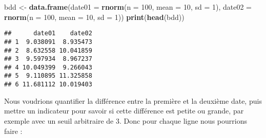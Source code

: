 \documentclass[]{book}
\newenvironment{Shaded}{\begin{snugshade}}{\end{snugshade}}
\newcommand{\KeywordTok}[1]{\textcolor[rgb]{0.13,0.29,0.53}{\textbf{#1}}}
\newcommand{\DataTypeTok}[1]{\textcolor[rgb]{0.13,0.29,0.53}{#1}}
\newcommand{\DecValTok}[1]{\textcolor[rgb]{0.00,0.00,0.81}{#1}}
\newcommand{\StringTok}[1]{\textcolor[rgb]{0.31,0.60,0.02}{#1}}
\newcommand{\NormalTok}[1]{#1}
\theoremstyle{definition}
\theoremstyle{definition}
\theoremstyle{definition}
\theoremstyle{remark}
\begin{document}
\begin{Shaded}
\begin{Highlighting}[]
\NormalTok{bdd <-}\StringTok{ }\KeywordTok{data.frame}\NormalTok{(}\DataTypeTok{date01 =} \KeywordTok{rnorm}\NormalTok{(}\DataTypeTok{n =} \DecValTok{100}\NormalTok{, }\DataTypeTok{mean =} \DecValTok{10}\NormalTok{, }\DataTypeTok{sd =} \DecValTok{1}\NormalTok{), }
                  \DataTypeTok{date02 =} \KeywordTok{rnorm}\NormalTok{(}\DataTypeTok{n =} \DecValTok{100}\NormalTok{, }\DataTypeTok{mean =} \DecValTok{10}\NormalTok{, }\DataTypeTok{sd =} \DecValTok{1}\NormalTok{))}
\KeywordTok{print}\NormalTok{(}\KeywordTok{head}\NormalTok{(bdd))}
\end{Highlighting}
\end{Shaded}

\begin{verbatim}
##      date01    date02
## 1  9.038091  8.935473
## 2  8.632558 10.041859
## 3  9.597934  8.967237
## 4 10.049399  9.266043
## 5  9.110895 11.325858
## 6 11.681112 10.019403
\end{verbatim}

Nous voudrions quantifier la différence entre la première et la deuxième
date, puis mettre un indicateur pour savoir si cette différence est
petite ou grande, par exemple avec un seuil arbitraire de 3. Donc pour
chaque ligne nous pourrions faire :
\end{document}
